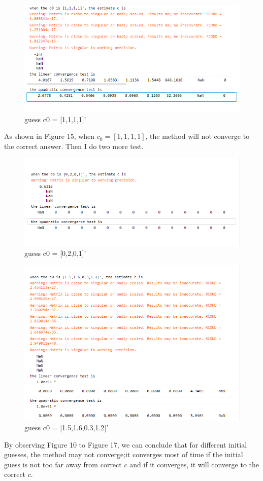 \documentclass[a4paper]{article}
\begin{document}
\begin{figure}[H] 
\centering 
\includegraphics[width=1.0\textwidth]{2.2-6.png}
\caption{guess c0 = [1,1,1,1]'} 
\label{Fig.2.2-6} 
\end{figure}

As shown in Figure 15, when $c_{0} = [1,1,1,1]$, the method will not converge to the correct answer. Then I do two more test.


\begin{figure}[H] 
\centering 
\includegraphics[width=1.0\textwidth]{2.2-7.png}
\caption{guess c0 = [0,2,0,1]'} 
\label{Fig.2.2-7} 
\end{figure}


\begin{figure}[H] 
\centering 
\includegraphics[width=1.0\textwidth]{2.2-8.png}
\caption{guess c0 = [1.5,1.6,0.3,1.2]'} 
\label{Fig.2.2-8} 
\end{figure}
By observing Figure 10 to Figure 17, we can conclude that for different initial guesses, the method may not converge;it converges most of time if the initial guess is not too far away from correct $c$ and if it converges, it will converge to the correct $c$.\\
\end{document}
